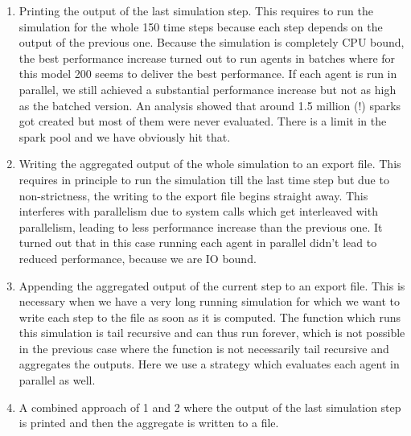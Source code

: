 \begin{enumerate}
	
	\item Printing the output of the last simulation step. This requires to run the simulation for the whole 150 time steps because each step depends on the output of the previous one. Because the simulation is completely CPU bound, the best performance increase turned out to run agents in batches where for this model 200 seems to deliver the best performance. If each agent is run in parallel, we still achieved a substantial performance increase but not as high as the batched version. An analysis showed that around 1.5 million (!) sparks got created but most of them were never evaluated. There is a limit in the spark pool and we have obviously hit that.
	
	\item Writing the aggregated output of the whole simulation to an export file. This requires in principle to run the simulation till the last time step but due to non-strictness, the writing to the export file begins straight away. This interferes with parallelism due to system calls which get interleaved with parallelism, leading to less performance increase than the previous one. It turned out that in this case running each agent in parallel didn't lead to reduced performance, because we are IO bound.
	
	\item Appending the aggregated output of the current step to an export file. This is necessary when we have a very long running simulation for which we want to write each step to the file as soon as it is computed. The function which runs this simulation is tail recursive and can thus run forever, which is not possible in the previous case where the function is not necessarily tail recursive and aggregates the outputs. Here we use a strategy which evaluates each agent in parallel as well.
	
	\item A combined approach of 1 and 2 where the output of the last simulation step is printed and then the aggregate is written to a file.
\end{enumerate}

